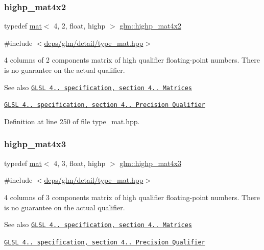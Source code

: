 \subsubsection{\texorpdfstring{highp\+\_\+mat4x2}{highp\_mat4x2}}
{\footnotesize\ttfamily typedef \hyperlink{structglm_1_1mat}{mat}$<$ 4, 2, float, highp $>$ \hyperlink{group__core__precision_ga0355949c79024224f7e9cfa06bc82153}{glm\+::highp\+\_\+mat4x2}}



{\ttfamily \#include $<$\hyperlink{type__mat_8hpp}{deps/glm/detail/type\+\_\+mat.\+hpp}$>$}

4 columns of 2 components matrix of high qualifier floating-\/point numbers. There is no guarantee on the actual qualifier.

\begin{DoxySeeAlso}{See also}
\href{http://www.opengl.org/registry/doc/GLSLangSpec.4.20.8.pdf}{\tt G\+L\+SL 4.. specification, section 4.. Matrices} 

\href{http://www.opengl.org/registry/doc/GLSLangSpec.4.20.8.pdf}{\tt G\+L\+SL 4.. specification, section 4.. Precision Qualifier} 
\end{DoxySeeAlso}


Definition at line 250 of file type\+\_\+mat.\+hpp.

\mbox{\label{group__core__precision_ga20620a62fd7d4e020e772c4d258cf2e4}} 
\subsubsection{\texorpdfstring{highp\+\_\+mat4x3}{highp\_mat4x3}}
{\footnotesize\ttfamily typedef \hyperlink{structglm_1_1mat}{mat}$<$ 4, 3, float, highp $>$ \hyperlink{group__core__precision_ga20620a62fd7d4e020e772c4d258cf2e4}{glm\+::highp\+\_\+mat4x3}}



{\ttfamily \#include $<$\hyperlink{type__mat_8hpp}{deps/glm/detail/type\+\_\+mat.\+hpp}$>$}

4 columns of 3 components matrix of high qualifier floating-\/point numbers. There is no guarantee on the actual qualifier.

\begin{DoxySeeAlso}{See also}
\href{http://www.opengl.org/registry/doc/GLSLangSpec.4.20.8.pdf}{\tt G\+L\+SL 4.. specification, section 4.. Matrices} 

\href{http://www.opengl.org/registry/doc/GLSLangSpec.4.20.8.pdf}{\tt G\+L\+SL 4.. specification, section 4.. Precision Qualifier} 
\end{DoxySeeAlso}


